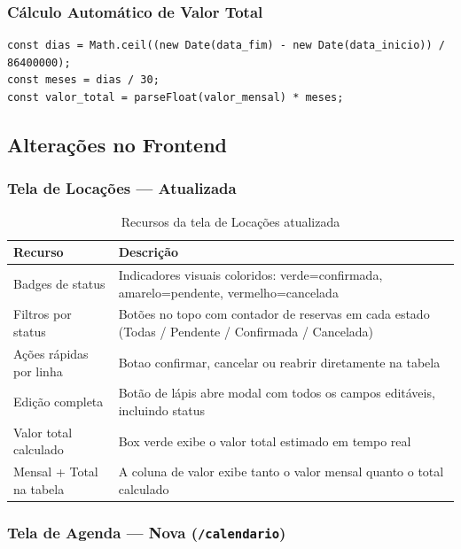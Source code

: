 \documentclass[12pt, a4paper]{article}
\newcommand{\thead}[1]{\cellcolor{tableheader}\color{white}\bfseries #1}
\newcommand{\talt}{\rowcolor{tablerowalt}}
\begin{document}
\subsubsection{Cálculo Automático de Valor Total}

\begin{lstlisting}[language=JavaScript2]
const dias = Math.ceil((new Date(data_fim) - new Date(data_inicio)) / 86400000);
const meses = dias / 30;
const valor_total = parseFloat(valor_mensal) * meses;
\end{lstlisting}

\subsection{Alterações no Frontend}

\subsubsection{Tela de Locações — Atualizada}

\begin{table}[H]
\centering
\begin{tabularx}{\textwidth}{|l|X|}
\hline
\thead{Recurso} & \thead{Descrição} \\
\hline
Badges de status      & Indicadores visuais coloridos: verde=confirmada, amarelo=pendente, vermelho=cancelada \\
\talt Filtros por status  & Botões no topo com contador de reservas em cada estado (Todas / Pendente / Confirmada / Cancelada) \\
Ações rápidas por linha & Botao confirmar, cancelar ou reabrir diretamente na tabela \\
\talt Edição completa    & Botão de lápis abre modal com todos os campos editáveis, incluindo status \\
Valor total calculado & Box verde exibe o valor total estimado em tempo real \\
\talt Mensal + Total na tabela & A coluna de valor exibe tanto o valor mensal quanto o total calculado \\
\hline
\end{tabularx}
\caption{Recursos da tela de Locações atualizada}
\end{table}

\subsubsection{Tela de Agenda — Nova (\texttt{/calendario})}
\end{document}
